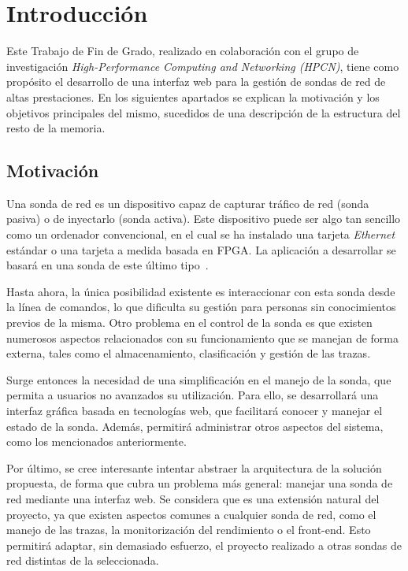 \chapter{Introducción}

Este Trabajo de Fin de Grado, realizado en colaboración con el grupo de investigación \textit{High-Performance Computing and Networking (HPCN)}, tiene como propósito el desarrollo de una interfaz web para la gestión de sondas de red de altas prestaciones.
En los siguientes apartados se explican la motivación y los objetivos principales del mismo, sucedidos de una descripción de la estructura del resto de la memoria.

\section{Motivación}

Una sonda de red es un dispositivo capaz de capturar tráfico de red (sonda pasiva) o de inyectarlo (sonda activa).
Este dispositivo puede ser algo tan sencillo como un ordenador convencional, en el cual se ha instalado una tarjeta \textit{Ethernet} estándar o una tarjeta a medida basada en \gls{FPGA}.
La aplicación a desarrollar se basará en una sonda de este último tipo~\cite{jfzazo}.

Hasta ahora, la única posibilidad existente es interaccionar con esta sonda desde la línea de comandos, lo que dificulta su gestión para personas sin conocimientos previos de la misma.
Otro problema en el control de la sonda es que existen numerosos aspectos relacionados con su funcionamiento que se manejan de forma externa, tales como el almacenamiento, clasificación y gestión de las \glspl{traza}.

Surge entonces la necesidad de una simplificación en el manejo de la sonda, que permita a usuarios no avanzados su utilización.
Para ello, se desarrollará una interfaz gráfica basada en tecnologías web, que facilitará conocer y manejar el estado de la sonda.
Además, permitirá administrar otros aspectos del sistema, como los mencionados anteriormente.

Por último, se cree interesante intentar abstraer la arquitectura de la solución propuesta, de forma que cubra un problema más general: manejar una sonda de red mediante una interfaz web.
Se considera que es una extensión natural del proyecto, ya que existen aspectos comunes a cualquier sonda de red, como el manejo de las \glspl{traza}, la monitorización del rendimiento o el \gls{front-end}.
Esto permitirá adaptar, sin demasiado esfuerzo, el proyecto realizado a otras sondas de red distintas de la seleccionada.

